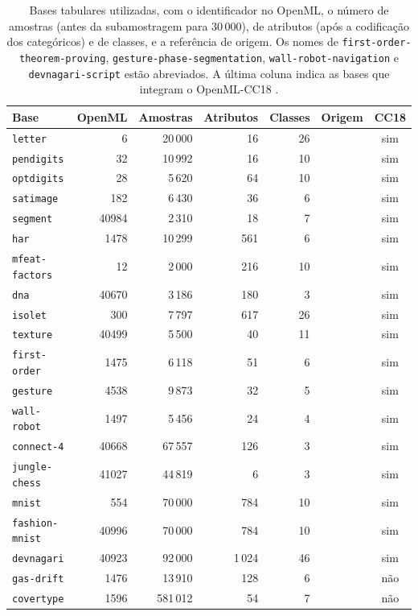 \begin{table}[pos=htbp]
\centering
\caption{Bases tabulares utilizadas, com o identificador no OpenML, o número de amostras (antes da subamostragem para 30\,000), de atributos (após a codificação dos categóricos) e de classes, e a referência de origem. Os nomes de \texttt{first-order-theorem-proving}, \texttt{gesture-phase-segmentation}, \texttt{wall-robot-navigation} e \texttt{devnagari-script} estão abreviados. A última coluna indica as bases que integram o OpenML-CC18 \citep{Bischl2021}.}
\label{tab:bases}
\footnotesize
\setlength{\tabcolsep}{4pt}
\begin{tabular}{l r r r r l c}
\hline
Base & OpenML & Amostras & Atributos & Classes & Origem & CC18 \\
\hline
\texttt{letter} & 6 & 20\,000 & 16 & 26 & \citet{FreySlate1991} & sim \\
\texttt{pendigits} & 32 & 10\,992 & 16 & 10 & \citet{UCIPendigits} & sim \\
\texttt{optdigits} & 28 & 5\,620 & 64 & 10 & \citet{AlpaydinKaynak1998} & sim \\
\texttt{satimage} & 182 & 6\,430 & 36 & 6 & \citet{UCISatimage} & sim \\
\texttt{segment} & 40984 & 2\,310 & 18 & 7 & \citet{UCISegment} & sim \\
\texttt{har} & 1478 & 10\,299 & 561 & 6 & \citet{Anguita2013} & sim \\
\texttt{mfeat-factors} & 12 & 2\,000 & 216 & 10 & \citet{vanBreukelen1998} & sim \\
\texttt{dna} & 40670 & 3\,186 & 180 & 3 & \citet{Michie1994} & sim \\
\texttt{isolet} & 300 & 7\,797 & 617 & 26 & \citet{FantyCole1991} & sim \\
\texttt{texture} & 40499 & 5\,500 & 40 & 11 & \citet{GuerinDugue1995} & sim \\
\texttt{first-order} & 1475 & 6\,118 & 51 & 6 & \citet{Bridge2014} & sim \\
\texttt{gesture} & 4538 & 9\,873 & 32 & 5 & \citet{Madeo2013} & sim \\
\texttt{wall-robot} & 1497 & 5\,456 & 24 & 4 & \citet{Freire2009} & sim \\
\texttt{connect-4} & 40668 & 67\,557 & 126 & 3 & \citet{Tromp1995} & sim \\
\texttt{jungle-chess} & 41027 & 44\,819 & 6 & 3 & \citet{vanRijn2014} & sim \\
\texttt{mnist} & 554 & 70\,000 & 784 & 10 & \citet{LeCun1998} & sim \\
\texttt{fashion-mnist} & 40996 & 70\,000 & 784 & 10 & \citet{Xiao2017} & sim \\
\texttt{devnagari} & 40923 & 92\,000 & 1\,024 & 46 & \citet{Acharya2015} & sim \\
\texttt{gas-drift} & 1476 & 13\,910 & 128 & 6 & \citet{Vergara2012} & não \\
\texttt{covertype} & 1596 & 581\,012 & 54 & 7 & \citet{Blackard1999} & não \\
\hline
\end{tabular}
\end{table}

